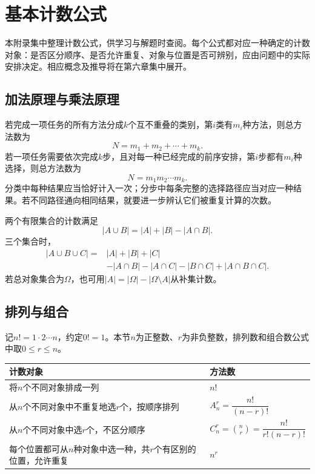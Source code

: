 \chapter{基本计数公式}
\label{app:counting-formulas}

本附录集中整理计数公式，供学习与解题时查阅。每个公式都对应一种确定的计数对象：是否区分顺序、是否允许重复、对象与位置是否可辨别，应由问题中的实际安排决定。相应概念及推导将在第六章集中展开。

\section{加法原理与乘法原理}

若完成一项任务的所有方法分成\(k\)个互不重叠的类别，第\(i\)类有\(m_i\)种方法，则总方法数为
\begin{equation*}
 N=m_1+m_2+\cdots+m_k.
\end{equation*}
若一项任务需要依次完成\(k\)步，且对每一种已经完成的前序安排，第\(i\)步都有\(m_i\)种选择，则总方法数为
\begin{equation*}
 N=m_1m_2\cdots m_k.
\end{equation*}
分类中每种结果应当恰好计入一次；分步中每条完整的选择路径应当对应一种结果。若不同路径通向相同结果，就要进一步辨认它们被重复计算的次数。

两个有限集合的计数满足
\begin{equation*}
 |A\cup B|=|A|+|B|-|A\cap B|.
\end{equation*}
三个集合时，
\begin{equation*}
 \begin{aligned}
 |A\cup B\cup C|={}&|A|+|B|+|C|\\
 &-|A\cap B|-|A\cap C|-|B\cap C|+|A\cap B\cap C|.
 \end{aligned}
\end{equation*}
若总对象集合为\(\Omega\)，也可用\(|A|=|\Omega|-|\Omega\setminus A|\)从补集计数。

\section{排列与组合}

记\(n!=1\cdot2\cdots n\)，约定\(0!=1\)。本节\(n\)为正整数、\(r\)为非负整数，排列数和组合数公式中取\(0\le r\le n\)。

\begingroup
\renewcommand{\arraystretch}{1.2}
\begin{longtable}{@{}p{.64\linewidth}p{.30\linewidth}@{}}
\toprule
计数对象 & 方法数 \\
\midrule
\endhead
将\(n\)个不同对象排成一列 & \(n!\) \\
从\(n\)个不同对象中不重复地选\(r\)个，按顺序排列 & \(A_n^r=\dfrac{n!}{(n-r)!}\) \\[5pt]
从\(n\)个不同对象中选\(r\)个，不区分顺序 & \(C_n^r=\binom nr=\dfrac{n!}{r!(n-r)!}\) \\[5pt]
每个位置都可从\(n\)种对象中选一种，共\(r\)个有区别的位置，允许重复 & \(n^r\) \\
\bottomrule
\end{longtable}
\endgroup

